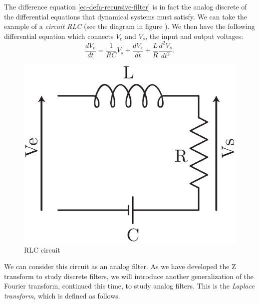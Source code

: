  
    The difference equation \eqref{eq-defn-recursive-filter} is in fact the analog discrete of the differential equations that dynamical systems must satisfy. We can take the example of a \textit{circuit RLC} (see the diagram in figure ). We then have the following differential equation which connects $ V_e $ and $ V_s $, the input and output voltages:
\begin{equation}
\label{eq-equation-circuit-rlc}
\frac{d V_e}{dt} = \frac{1}{RC} V_s + \frac{d V_s}{dt} + \frac{L}{R} \frac{d^2 V_s}{dt^2 }.
\end{equation}
\begin{figure}[ht] 
    \begin{center}
    \includegraphics[scale=0.4]{images/circuit-rlc.eps}
    \end{center}
    \caption{RLC circuit}
              \label{fig-circuit-rlc}
\end{figure}
 We can consider this circuit as an analog filter. As we have developed the Z transform to study discrete filters, we will introduce another generalization of the Fourier transform, continued this time, to study analog filters. This is the \textit{Laplace transform}, which is defined as follows.
 
